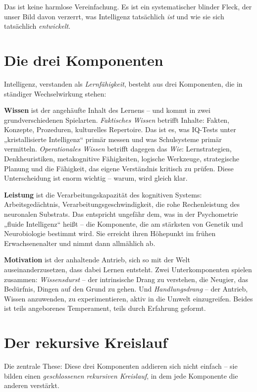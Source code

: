 \documentclass[11pt, twoside, openright]{book}
\begin{document}
Das ist keine harmlose Vereinfachung. Es ist ein systematischer blinder Fleck, der unser Bild davon verzerrt, was Intelligenz tatsächlich \textit{ist} und wie sie sich tatsächlich \textit{entwickelt}.

\section*{Die drei Komponenten}

Intelligenz, verstanden als \textit{Lernfähigkeit}, besteht aus drei Komponenten, die in ständiger Wechselwirkung stehen:

\textbf{Wissen} ist der angehäufte Inhalt des Lernens -- und kommt in zwei grundverschiedenen Spielarten. \textit{Faktisches Wissen} betrifft Inhalte: Fakten, Konzepte, Prozeduren, kulturelles Repertoire. Das ist es, was IQ-Tests unter „kristallisierte Intelligenz“ primär messen und was Schulsysteme primär vermitteln. \textit{Operationales Wissen} betrifft dagegen das \textit{Wie}: Lernstrategien, Denkheuristiken, metakognitive Fähigkeiten, logische Werkzeuge, strategische Planung und die Fähigkeit, das eigene Verständnis kritisch zu prüfen. Diese Unterscheidung ist enorm wichtig -- warum, wird gleich klar.

\textbf{Leistung} ist die Verarbeitungskapazität des kognitiven Systems: Arbeitsgedächtnis, Verarbeitungsgeschwindigkeit, die rohe Rechenleistung des neuronalen Substrats. Das entspricht ungefähr dem, was in der Psychometrie „fluide Intelligenz“ heißt -- die Komponente, die am stärksten von Genetik und Neurobiologie bestimmt wird. Sie erreicht ihren Höhepunkt im frühen Erwachsenenalter und nimmt dann allmählich ab.

\textbf{Motivation} ist der anhaltende Antrieb, sich so mit der Welt auseinanderzusetzen, dass dabei Lernen entsteht. Zwei Unterkomponenten spielen zusammen: \textit{Wissensdurst} -- der intrinsische Drang zu verstehen, die Neugier, das Bedürfnis, Dingen auf den Grund zu gehen. Und \textit{Handlungsdrang} -- der Antrieb, Wissen anzuwenden, zu experimentieren, aktiv in die Umwelt einzugreifen. Beides ist teils angeborenes Temperament, teils durch Erfahrung geformt.

\section*{Der rekursive Kreislauf}

Die zentrale These: Diese drei Komponenten addieren sich nicht einfach -- sie bilden einen \textit{geschlossenen rekursiven Kreislauf}, in dem jede Komponente die anderen verstärkt.
\end{document}

